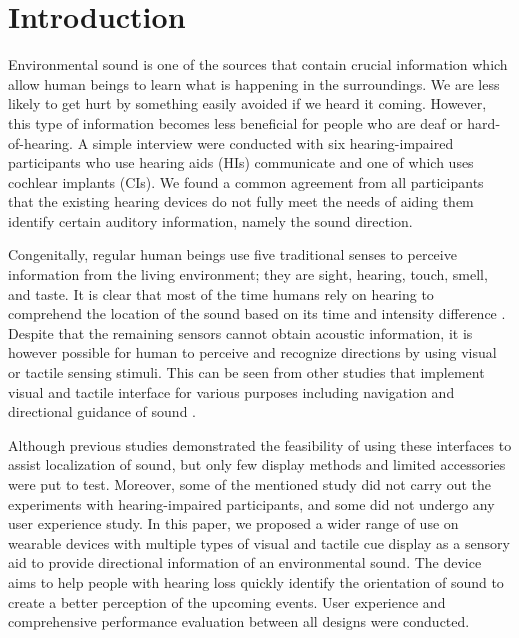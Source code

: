 \documentclass{sigchi}
\begin{document}

\section{Introduction}
Environmental sound is one of the sources that contain crucial information which allow human beings to learn what is happening in the surroundings. We are less likely to get hurt by something easily avoided if we heard it coming. However, this type of information becomes less beneficial for people who are deaf or hard-of-hearing. A simple interview were conducted with six hearing-impaired participants who use hearing aids (HIs) communicate and one of which uses cochlear implants (CIs). We found a common agreement from all participants that the existing hearing devices do not fully meet the needs of aiding them identify certain auditory information, namely the sound direction.

Congenitally, regular human beings use five traditional senses to perceive information from the living environment; they are sight, hearing, touch, smell, and taste. It is clear that most of the time humans rely on hearing to comprehend the location of the sound based on its time and intensity difference \cite{Wallach1939}. Despite that the remaining sensors cannot obtain acoustic information, it is however possible for human to perceive and recognize directions by using visual or tactile sensing stimuli. This can be seen from other studies that implement visual and tactile interface for various purposes including navigation and directional guidance of sound \cite{Borg,Kim2013,Tessendorf2011,Tsukada2004}.

Although previous studies demonstrated the feasibility of using these interfaces to assist localization of sound, but only few display methods and limited accessories were put to test. Moreover, some of the mentioned study did not carry out the experiments with hearing-impaired participants, and some did not undergo any user experience study. In this paper, we proposed a wider range of use on wearable devices with multiple types of visual and tactile cue display as a sensory aid to provide directional information of an environmental sound. The device aims to help people with hearing loss quickly identify the orientation of sound to create a better perception of the upcoming events. User experience and comprehensive performance evaluation between all designs were conducted.
\end{document}

